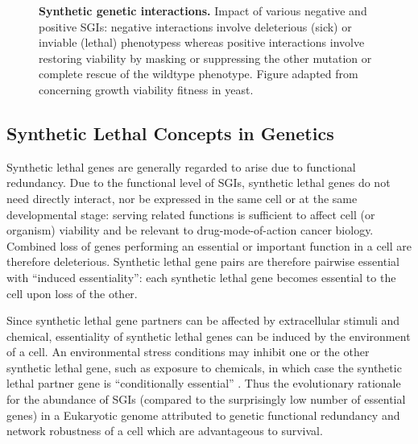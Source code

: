\begin{figure}[!ht]
\begin{mdframed}
   \caption[Synthetic genetic interactions]{\small \textbf{Synthetic genetic interactions.} Impact of various negative and positive SGIs: negative interactions involve deleterious (sick) or inviable (lethal) phenotypess whereas positive interactions involve restoring viability by masking or suppressing the other mutation or complete rescue of the wildtype phenotype. Figure adapted from \citep{Costanzo2011} concerning growth viability fitness in yeast.}
\label{fig:Costanzo2011}
\end{mdframed}
\end{figure}

\subsection{Synthetic Lethal Concepts in Genetics}

Synthetic lethal genes are generally regarded to arise due to functional redundancy. Due to the functional level of SGIs, synthetic lethal genes do not need directly interact, nor be expressed in the same cell or at the same developmental stage: serving related functions is sufficient to affect cell (or organism) viability and be relevant to drug-mode-of-action cancer biology. Combined loss of genes performing an essential or important function in a cell are therefore deleterious. Synthetic lethal gene pairs are therefore pairwise essential with ``induced essentiality'': each synthetic lethal gene becomes essential to the cell upon loss of the other.

Since synthetic lethal gene partners can be affected by extracellular stimuli and chemical, essentiality of synthetic lethal genes can be induced by the environment of a cell.  An environmental stress conditions may inhibit one or the other synthetic lethal gene, such as exposure to chemicals, in which case the synthetic lethal partner gene is ``conditionally essential'' \citep{Hillenmeyer2008}. Thus the evolutionary rationale for the abundance of SGIs (compared to the surprisingly low number of essential genes) in a Eukaryotic genome attributed to genetic functional redundancy and network robustness of a cell which are advantageous to survival. 

